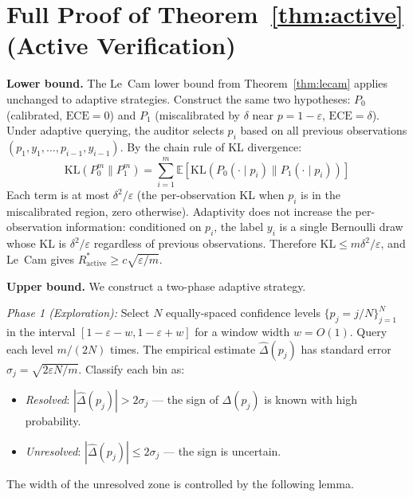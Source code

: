 \documentclass{article}
\newcommand{\ECE}{\mathrm{ECE}}
\newcommand{\errrate}{\varepsilon}
\newcommand{\nsamples}{m}
\newcommand{\calmap}{\Delta}
\providecommand{\E}{}
\renewcommand{\E}{\mathbb{E}}
\providecommand{\KL}{}
\renewcommand{\KL}{\mathrm{KL}}
\newcommand{\activeR}{R^*_{\mathrm{active}}}
\theoremstyle{definition}
\begin{document}
\section{Full Proof of Theorem~\ref{thm:active} (Active Verification)}
\label{app:active-proof}

\textbf{Lower bound.} The Le~Cam lower bound from Theorem~\ref{thm:lecam} applies unchanged to adaptive strategies. Construct the same two hypotheses: $P_0$ (calibrated, $\ECE = 0$) and $P_1$ (miscalibrated by $\delta$ near $p = 1 - \errrate$, $\ECE = \delta$). Under adaptive querying, the auditor selects $p_i$ based on all previous observations $(p_1, y_1, \ldots, p_{i-1}, y_{i-1})$. By the chain rule of KL divergence:
\begin{equation}
\KL(P_0^{\nsamples} \| P_1^{\nsamples}) = \sum_{i=1}^{\nsamples} \E\left[\KL(P_0(\cdot \mid p_i) \| P_1(\cdot \mid p_i))\right]
\end{equation}
Each term is at most $\delta^2 / \errrate$ (the per-observation KL when $p_i$ is in the miscalibrated region, zero otherwise). Adaptivity does not increase the per-observation information: conditioned on $p_i$, the label $y_i$ is a single Bernoulli draw whose KL is $\delta^2 / \errrate$ regardless of previous observations. Therefore $\KL \leq \nsamples \delta^2 / \errrate$, and Le~Cam gives $\activeR \geq c\sqrt{\errrate / \nsamples}$.

\textbf{Upper bound.} We construct a two-phase adaptive strategy.

\emph{Phase 1 (Exploration):} Select $N$ equally-spaced confidence levels $\{p_j = j/N\}_{j=1}^{N}$ in the interval $[1 - \errrate - w, 1 - \errrate + w]$ for a window width $w = O(1)$. Query each level $\nsamples/(2N)$ times. The empirical estimate $\hat{\calmap}(p_j)$ has standard error $\sigma_j = \sqrt{2\errrate N / \nsamples}$. Classify each bin as:
\begin{itemize}
\item \emph{Resolved}: $|\hat{\calmap}(p_j)| > 2\sigma_j$ --- the sign of $\calmap(p_j)$ is known with high probability.
\item \emph{Unresolved}: $|\hat{\calmap}(p_j)| \leq 2\sigma_j$ --- the sign is uncertain.
\end{itemize}

The width of the unresolved zone is controlled by the following lemma.
\end{document}
